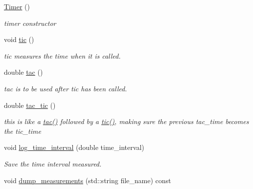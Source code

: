 \begin{DoxyCompactItemize}
\item 
\mbox{\label{classreal__time__tools_1_1Timer_a572f7022db18de269ba08b31b05b4af7}} 
\hyperlink{classreal__time__tools_1_1Timer_a572f7022db18de269ba08b31b05b4af7}{Timer} ()
\begin{DoxyCompactList}\small\item\em timer constructor \end{DoxyCompactList}\item 
void \hyperlink{classreal__time__tools_1_1Timer_a540f7f6925768c6f333b2fef4a914374}{tic} ()
\begin{DoxyCompactList}\small\item\em tic measures the time when it is called. \end{DoxyCompactList}\item 
double \hyperlink{classreal__time__tools_1_1Timer_a3d55794492714544c5c83aed23d8f1f9}{tac} ()
\begin{DoxyCompactList}\small\item\em tac is to be used after tic has been called. \end{DoxyCompactList}\item 
\mbox{\label{classreal__time__tools_1_1Timer_a310fc3b9165c3751a36ff92586f0facd}} 
double \hyperlink{classreal__time__tools_1_1Timer_a310fc3b9165c3751a36ff92586f0facd}{tac\+\_\+tic} ()
\begin{DoxyCompactList}\small\item\em this is like a \hyperlink{classreal__time__tools_1_1Timer_a3d55794492714544c5c83aed23d8f1f9}{tac()} followed by a \hyperlink{classreal__time__tools_1_1Timer_a540f7f6925768c6f333b2fef4a914374}{tic()}, making sure the previous tac\+\_\+time becomes the tic\+\_\+time \end{DoxyCompactList}\item 
void \hyperlink{classreal__time__tools_1_1Timer_a14bd35142437b42533b1b478ce044c8f}{log\+\_\+time\+\_\+interval} (double time\+\_\+interval)
\begin{DoxyCompactList}\small\item\em Save the time interval measured. \end{DoxyCompactList}\item 
void \hyperlink{classreal__time__tools_1_1Timer_a05347a5971441d46b1293f8ed9361b0f}{dump\+\_\+measurements} (std\+::string file\+\_\+name) const

\end{DoxyCompactItemize}
